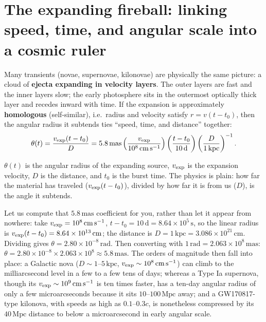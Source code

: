 \section{The expanding fireball: linking speed, time, and angular scale into a cosmic ruler}
\label{sec:e20-expansion}

Many transients (novae, supernovae, kilonovae) are physically the same picture: a cloud of \textbf{ejecta expanding in velocity layers}. The outer layers are fast and the inner layers slow; the early photosphere sits in the outermost optically thick layer and recedes inward with time. If the expansion is approximately \textbf{homologous} (self-similar), i.e.\ radius and velocity satisfy \(r=v(t-t_0)\), then the angular radius it subtends ties ``speed, time, and distance'' together:
\begin{equation}
  \theta(t)=\frac{v_{\rm exp}(t-t_0)}{D}
  =
  5.8\,{\rm mas}
  \left(\frac{v_{\rm exp}}{10^8\,{\rm cm\,s^{-1}}}\right)
  \left(\frac{t-t_0}{10\,{\rm d}}\right)
  \left(\frac{D}{1\,{\rm kpc}}\right)^{-1}.
  \label{eq:e20-angular-expansion}
\end{equation}
\begin{formulaexplain}
\(\theta(t)\) is the angular radius of the expanding source, \(v_{\rm exp}\) is the expansion velocity, \(D\) is the distance, and \(t_0\) is the burst time. The physics is plain: how far the material has traveled (\(v_{\rm exp}(t-t_0)\)), divided by how far it is from us (\(D\)), is the angle it subtends.
\end{formulaexplain}
Let us compute that \(5.8\,\mathrm{mas}\) coefficient for you, rather than let it appear from nowhere: take \(v_{\rm exp}=10^8\,\mathrm{cm\,s^{-1}}\), \(t-t_0=10\,\mathrm{d}=8.64\times10^5\,\mathrm{s}\), so the linear radius is \(v_{\rm exp}(t-t_0)=8.64\times10^{13}\,\mathrm{cm}\); the distance is \(D=1\,\mathrm{kpc}=3.086\times10^{21}\,\mathrm{cm}\). Dividing gives \(\theta=2.80\times10^{-8}\,\mathrm{rad}\). Then converting with \(1\,\mathrm{rad}=2.063\times10^{8}\,\mathrm{mas}\): \(\theta=2.80\times10^{-8}\times2.063\times10^{8}\approx5.8\,\mathrm{mas}\). The orders of magnitude then fall into place: a Galactic nova (\(D\sim1\text{--}5\,\mathrm{kpc}\), \(v_{\rm exp}\sim10^8\,\mathrm{cm\,s^{-1}}\)) can climb to the milliarcsecond level in a few to a few tens of days; whereas a Type Ia supernova, though its \(v_{\rm exp}\sim10^9\,\mathrm{cm\,s^{-1}}\) is ten times faster, has a ten-day angular radius of only a few microarcseconds because it sits \(10\text{--}100\,\mathrm{Mpc}\) away; and a GW170817-type kilonova, with speeds as high as \(0.1\text{--}0.3c\), is nonetheless compressed by its \(40\,\mathrm{Mpc}\) distance to below a microarcsecond in early angular scale.

